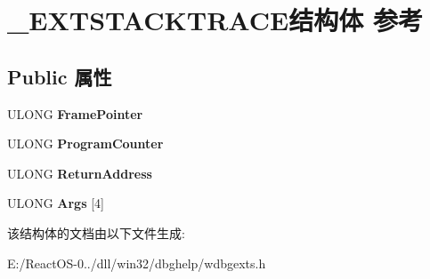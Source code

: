\hypertarget{struct___e_x_t_s_t_a_c_k_t_r_a_c_e}{}\section{\+\_\+\+E\+X\+T\+S\+T\+A\+C\+K\+T\+R\+A\+C\+E结构体 参考}
\label{struct___e_x_t_s_t_a_c_k_t_r_a_c_e}
\subsection*{Public 属性}
\begin{DoxyCompactItemize}
\item 
\mbox{\label{struct___e_x_t_s_t_a_c_k_t_r_a_c_e_a1c8f8bcc9fae70af24795bbd88472c9a}} 
U\+L\+O\+NG {\bfseries Frame\+Pointer}
\item 
\mbox{\label{struct___e_x_t_s_t_a_c_k_t_r_a_c_e_aceed2d3abf9c589fa70472ba81fd50d8}} 
U\+L\+O\+NG {\bfseries Program\+Counter}
\item 
\mbox{\label{struct___e_x_t_s_t_a_c_k_t_r_a_c_e_a48491ea867e27beaba8f0b1c2ac6735d}} 
U\+L\+O\+NG {\bfseries Return\+Address}
\item 
\mbox{\label{struct___e_x_t_s_t_a_c_k_t_r_a_c_e_a592bbdb31489a71a3379402363fc47bb}} 
U\+L\+O\+NG {\bfseries Args} \mbox{[}4\mbox{]}
\end{DoxyCompactItemize}


该结构体的文档由以下文件生成\+:\begin{DoxyCompactItemize}
\item 
E\+:/\+React\+O\+S-\/0../dll/win32/dbghelp/wdbgexts.\+h\end{DoxyCompactItemize}
